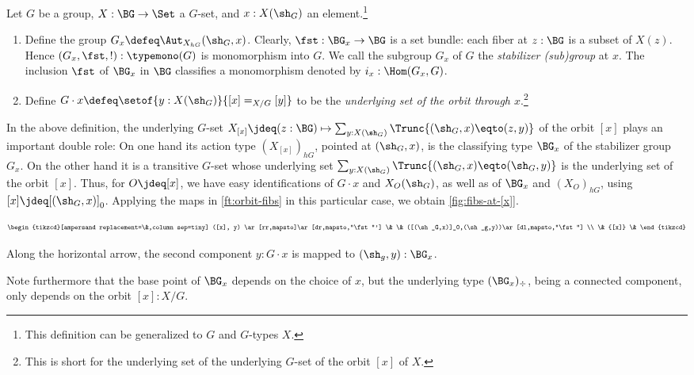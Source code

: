 \begin{definition}\label{def:orbit-stabilizer}
  Let $G$ be a group, $X : \BG \to \Set$ a $G$-set, 
  and $x : X(\sh_G)$ an element.\footnote{%
  This definition can be generalized to \inftygps $G$ and $G$-types $X$.}
  \begin{enumerate}
  \item Define the group $G_x \defeq \Aut_{X_{hG}}(\sh_G,x)$.
  Clearly, $\fst:\BG_x \to \BG$ is a set bundle:
  each fiber at $z:\BG$ is a subset of $X(z)$.
  Hence $(G_x,\fst,!):\typemono(G)$ is monomorphism into $G$.
  We call the subgroup $G_x$ of $G$ the 
  \emph{stabilizer (sub)group}%
     at $x$. The inclusion $\fst$ of $\BG_x$ in
    $\BG$ classifies a monomorphism denoted by $i_x : \Hom(G_x,G)$.
  \item Define $G\cdot x \defeq \setof{y : X(\sh_G)}{[x] =_{X/G} [y]}$
    to be the \emph{underlying set of the orbit through $x$}.\footnote{%
    This is short for the underlying set of the underlying $G$-set of the
    orbit $[x]$ of $X$.}
    \qedhere
  \end{enumerate}
\end{definition}

\begin{remark}\label{rem:orbit-fibs}
In the above definition, the underlying $G$-set $X_{[x]} \jdeq
(z:\BG)\mapsto\sum_{y:X(\sh_G)}\Trunc{(\sh_G,x)\eqto(z,y)}$
of the orbit $[x]$ plays an important double role: On one hand its
action type $(X_{[x]})_{hG}$,
pointed at $(\sh_G,x)$, is the classifying type $\BG_x$ of the stabilizer
group $G_x$. On the other hand it is a transitive $G$-set whose
underlying set $\sum_{y:X(\sh_G)}\Trunc{(\sh_G,x)\eqto(\sh_G,y)}$
is the underlying set of the orbit $[x]$. Thus,
for $O\jdeq[x]$, we have easy identifications of $G\cdot x$ and $X_O(\sh_G)$,
as well as of $\BG_x$ and $(X_O)_{hG}$, using $[x]\jdeq[(\sh_G,x)]_0$.
Applying the maps in \cref{ft:orbit-fibs} in this particular case, 
we obtain \cref{fig:fibs-at-[x]}.
\begin{marginfigure}
  \[\footnotesize %
    \begin{tikzcd}[ampersand replacement=\&,column sep=tiny]
      ([x], y) \ar[rr,mapsto]\ar[dr,mapsto,"\fst"']
      \& \& ([(\sh_G,x)]_0,(\sh_g,y))\ar[dl,mapsto,"\fst"] \\
      \& {[x]} \&
    \end{tikzcd}
  \]
  \caption{\label{fig:fibs-at-[x]}Along the horizontal arrow,
  the second component $y:G\cdot x$ is mapped to $(\sh_g,y):\BG_x$.}
\end{marginfigure}

Note furthermore that the base point of $\BG_x$ depends on the choice of $x$,
but the underlying type $(\BG_x)_\div$, being a connected component,
only depends on the orbit $[x]:X/G$.
\end{remark}

